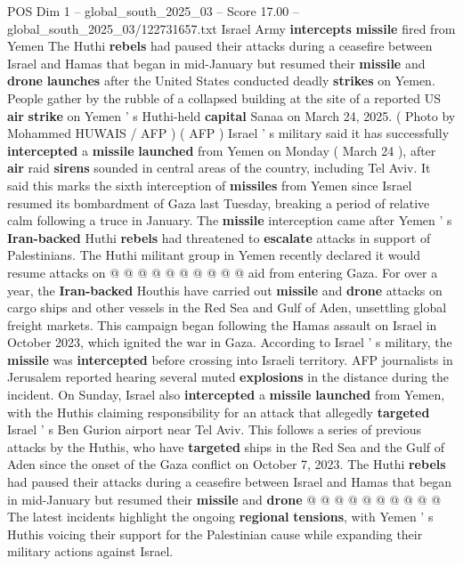 \begin{textsample}{POS Dim 1 – global\_south\_2025\_03 – Score 17.00 – global\_south\_2025\_03/122731657.txt}  \label{ex:f1_pos_296}
Israel Army \textbf{intercepts} \textbf{missile} fired from Yemen The Huthi \textbf{rebels} had paused their attacks during a ceasefire between Israel and Hamas that began in mid-January but resumed their \textbf{missile} and \textbf{drone} \textbf{launches} after the United States conducted deadly \textbf{strikes} on Yemen.
People gather by the rubble of a collapsed building at the site of a reported US \textbf{air} \textbf{strike} on Yemen ' s Huthi-held \textbf{capital} Sanaa on March 24, 2025. ( Photo by Mohammed HUWAIS / AFP ) ( AFP ) Israel ' s military said it has successfully \textbf{intercepted} a \textbf{missile} \textbf{launched} from Yemen on Monday ( March 24 ), after \textbf{air} raid \textbf{sirens} sounded in central areas of the country, including Tel Aviv.
It said this marks the sixth interception of \textbf{missiles} from Yemen since Israel resumed its bombardment of Gaza last Tuesday, breaking a period of relative calm following a truce in January.
The \textbf{missile} interception came after Yemen ' s \textbf{Iran-backed} Huthi \textbf{rebels} had threatened to \textbf{escalate} attacks in support of Palestinians.
The Huthi militant group in Yemen recently declared it would resume attacks on @ @ @ @ @ @ @ @ @ @ aid from entering Gaza.
For over a year, the \textbf{Iran-backed} Houthis have carried out \textbf{missile} and \textbf{drone} attacks on cargo ships and other vessels in the Red Sea and Gulf of Aden, unsettling global freight markets.
This campaign began following the Hamas assault on Israel in October 2023, which ignited the war in Gaza.
According to Israel ' s military, the \textbf{missile} was \textbf{intercepted} before crossing into Israeli territory.
AFP journalists in Jerusalem reported hearing several muted \textbf{explosions} in the distance during the incident.
On Sunday, Israel also \textbf{intercepted} a \textbf{missile} \textbf{launched} from Yemen, with the Huthis claiming responsibility for an attack that allegedly \textbf{targeted} Israel ' s Ben Gurion airport near Tel Aviv.
This follows a series of previous attacks by the Huthis, who have \textbf{targeted} ships in the Red Sea and the Gulf of Aden since the onset of the Gaza conflict on October 7, 2023.
The Huthi \textbf{rebels} had paused their attacks during a ceasefire between Israel and Hamas that began in mid-January but resumed their \textbf{missile} and \textbf{drone} @ @ @ @ @ @ @ @ @ @ The latest incidents highlight the ongoing \textbf{regional} \textbf{tensions}, with Yemen ' s Huthis voicing their support for the Palestinian cause while expanding their military actions against Israel.

\end{textsample}
